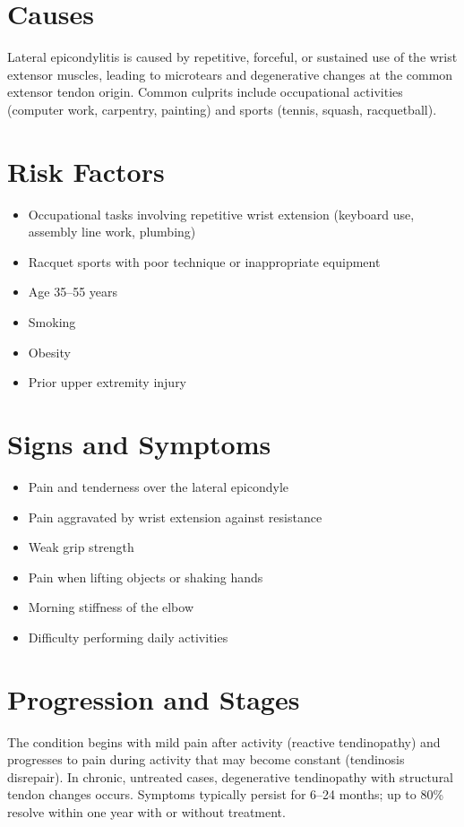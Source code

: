 \section{Causes}
Lateral epicondylitis is caused by repetitive, forceful, or sustained use of the wrist extensor muscles, leading to microtears and degenerative changes at the common extensor tendon origin. Common culprits include occupational activities (computer work, carpentry, painting) and sports (tennis, squash, racquetball).

\section{Risk Factors}
\begin{itemize}[noitemsep]
  \item Occupational tasks involving repetitive wrist extension (keyboard use, assembly line work, plumbing)
  \item Racquet sports with poor technique or inappropriate equipment
  \item Age 35--55 years
  \item Smoking
  \item Obesity
  \item Prior upper extremity injury
\end{itemize}

\section{Signs and Symptoms}
\begin{itemize}[noitemsep]
  \item Pain and tenderness over the lateral epicondyle
  \item Pain aggravated by wrist extension against resistance
  \item Weak grip strength
  \item Pain when lifting objects or shaking hands
  \item Morning stiffness of the elbow
  \item Difficulty performing daily activities
\end{itemize}

\section{Progression and Stages}
The condition begins with mild pain after activity (reactive tendinopathy) and progresses to pain during activity that may become constant (tendinosis disrepair). In chronic, untreated cases, degenerative tendinopathy with structural tendon changes occurs. Symptoms typically persist for 6--24 months; up to 80\% resolve within one year with or without treatment.

